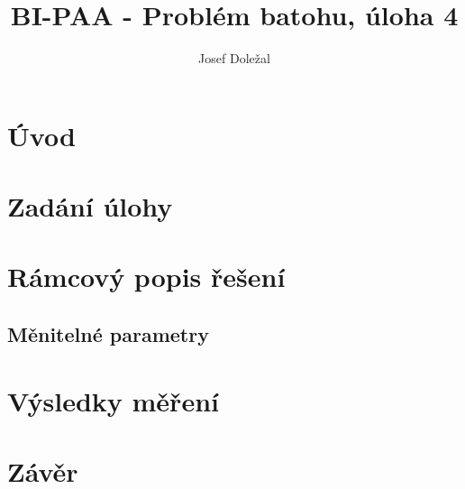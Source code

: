 \documentclass[czech]{article}
\title{BI-PAA - Problém batohu, úloha 4}
\author{Josef Doležal}
\begin{document}
\maketitle

\newpage

\section{Úvod}

\section{Zadání úlohy}

\section{Rámcový popis řešení}

\subsection*{Měnitelné parametry}

\section{Výsledky měření}

\section{Závěr}
\end{document}

